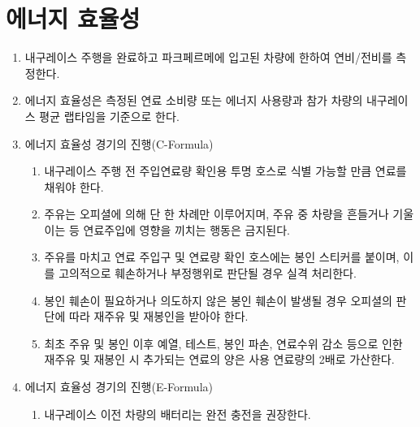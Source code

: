 \documentclass[final,a4paper,10pt]{report}
\begin{document}
{\section{에너지 효율성}\label{rule:formula-competition.energy-efficiency}
\begin{enumerate}
  \item\label{rule:formula-competition.energy-efficiency.measured-for-finishers-only} 내구레이스 주행을 완료하고 파크페르메에 입고된 차량에 한하여 연비/전비를 측정한다.
  \item\label{rule:formula-competition.energy-efficiency.basis-consumption-and-laptime} 에너지 효율성은 측정된 연료 소비량 또는 에너지 사용량과 참가 차량의 내구레이스 평균 랩타임을 기준으로 한다.
  \item\label{rule:formula-competition.energy-efficiency.procedure-c-formula} 에너지 효율성 경기의 진행(C-Formula)
    \begin{enumerate}
      \item\label{rule:formula-competition.energy-efficiency.procedure-c-formula.fill-via-clear-hose} 내구레이스 주행 전 주입연료량 확인용 투명 호스로 식별 가능할 만큼 연료를 채워야 한다.
      \item\label{rule:formula-competition.energy-efficiency.procedure-c-formula.single-refuel-no-tilting} 주유는 오피셜에 의해 단 한 차례만 이루어지며, 주유 중 차량을 흔들거나 기울이는 등 연료주입에 영향을 끼치는 행동은 금지된다.
      \item\label{rule:formula-competition.energy-efficiency.procedure-c-formula.seal-tamper-disqualifies} 주유를 마치고 연료 주입구 및 연료량 확인 호스에는 봉인 스티커를 붙이며, 이를 고의적으로 훼손하거나 부정행위로 판단될 경우 실격 처리한다.
      \item\label{rule:formula-competition.energy-efficiency.procedure-c-formula.reseal-on-breakage} 봉인 훼손이 필요하거나 의도하지 않은 봉인 훼손이 발생될 경우 오피셜의 판단에 따라 재주유 및 재봉인을 받아야 한다.
      \item\label{rule:formula-competition.energy-efficiency.procedure-c-formula.refuel-topup-2x-penalty} 최초 주유 및 봉인 이후 예열, 테스트, 봉인 파손, 연료수위 감소 등으로 인한 재주유 및 재봉인 시 추가되는 연료의 양은 사용 연료량의 2배로 가산한다.
    \end{enumerate}
  \item\label{rule:formula-competition.energy-efficiency.procedure-e-formula} 에너지 효율성 경기의 진행(E-Formula)
    \begin{enumerate}
      \item\label{rule:formula-competition.energy-efficiency.procedure-e-formula.full-charge-recommended} 내구레이스 이전 차량의 배터리는 완전 충전을 권장한다.

\end{enumerate}
\end{enumerate}}
\end{document}

